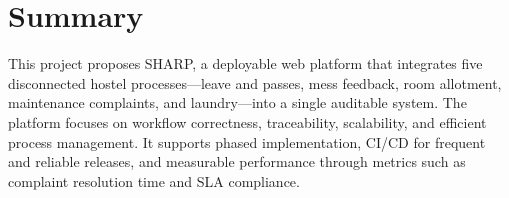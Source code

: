 \documentclass[11pt,a4paper]{article}
\begin{document}
\section{Summary}
This project proposes SHARP, a deployable web platform that integrates five disconnected hostel processes—leave and passes, mess feedback, room allotment, maintenance complaints, and laundry—into a single auditable system. The platform focuses on workflow correctness, traceability, scalability, and efficient process management. It supports phased implementation, CI/CD for frequent and reliable releases, and measurable performance through metrics such as complaint resolution time and SLA compliance.
\end{document}
